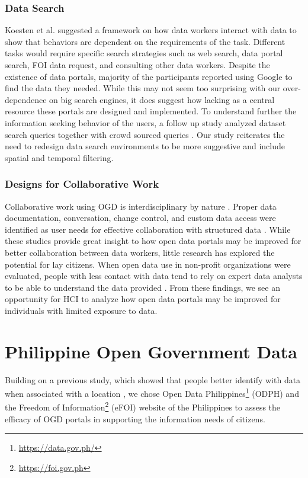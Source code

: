 \documentclass{sigchi}
\begin{document}
\subsubsection{Data Search}
Koesten et al. \cite{Koesten2017} suggested a framework on how data workers interact with data to show that behaviors are dependent on the requirements of the task. Different tasks would require specific search strategies such as web search, data portal search, FOI data request, and consulting other data workers. Despite the existence of data portals, majority of the participants reported using Google to find the data they needed. While this may not seem too surprising with our over-dependence on big search engines, it does suggest how lacking as a central resource these portals are designed and implemented. To understand further the information seeking behavior of the users, a follow up study analyzed dataset search queries together with crowd sourced queries \cite{kacprzak2019characterising}. Our study reiterates the need to redesign data search environments to be more suggestive and include spatial and temporal filtering.

\subsubsection{Designs for Collaborative Work}
Collaborative work using OGD is interdisciplinary by nature \cite{Choi2017}. Proper data documentation, conversation, change control, and custom data access were identified as user needs for effective collaboration with structured data \cite{Koesten2019}. While these studies provide great insight to how open data portals may be improved for better collaboration between data workers, little research has explored the potential for lay citizens. When open data use in non-profit organizations were evaluated, people with less contact with data tend to rely on expert data analysts to be able to understand the data provided \cite{Erete2016}. From these findings, we see an opportunity for HCI to analyze how open data portals may be improved for individuals with limited exposure to data.

\section{Philippine Open Government Data}
Building on a previous study, which showed that people better identify with data when associated with a location \cite{Puussaar2018}, we chose Open Data Philippines\footnote{\url{https://data.gov.ph/}} (ODPH) and the Freedom of Information\footnote{\url{https://foi.gov.ph}} (eFOI) website of the Philippines to assess the efficacy of OGD portals in supporting the information needs of citizens. 
\end{document}
